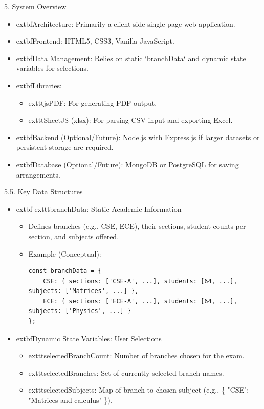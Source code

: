\documentclass{beamer}
\begin{document}
\begin{frame}{5. System Overview}
    \begin{itemize}
        \item 	extbf{Architecture:} Primarily a client-side single-page web application.
        \item 	extbf{Frontend:} HTML5, CSS3, Vanilla JavaScript.
        \item 	extbf{Data Management:} Relies on static `branchData` and dynamic state variables for selections.
        \item 	extbf{Libraries:}
            \begin{itemize}
                \item 	exttt{jsPDF}: For generating PDF output.
                \item 	exttt{SheetJS (xlsx)}: For parsing CSV input and exporting Excel.
            \end{itemize}
        \item 	extbf{Backend (Optional/Future):} Node.js with Express.js if larger datasets or persistent storage are required.
        \item 	extbf{Database (Optional/Future):} MongoDB or PostgreSQL for saving arrangements.
    \end{itemize}
\end{frame}

\begin{frame}{5.5. Key Data Structures}
    \begin{itemize}
        \item 	extbf{	exttt{branchData}: Static Academic Information}
        \begin{itemize}
            \item Defines branches (e.g., CSE, ECE), their sections, student counts per section, and subjects offered.
            \item Example (Conceptual):
            \begin{tiny}
            \begin{Verbatim}[commandchars=\{\}]
const branchData = {
    CSE: { sections: ['CSE-A', ...], students: [64, ...], subjects: ['Matrices', ...] },
    ECE: { sections: ['ECE-A', ...], students: [64, ...], subjects: ['Physics', ...] }
};
            \end{Verbatim}
            \end{tiny}
        \end{itemize}
        \item 	extbf{Dynamic State Variables: User Selections}
        \begin{itemize}
            \item 	exttt{selectedBranchCount}: Number of branches chosen for the exam.
            \item 	exttt{selectedBranches}: Set of currently selected branch names.
            \item 	exttt{selectedSubjects}: Map of branch to chosen subject (e.g., \{ "CSE": "Matrices and calculus" \}).
        \end{itemize}
    \end{itemize}
\end{frame}
\end{document}
